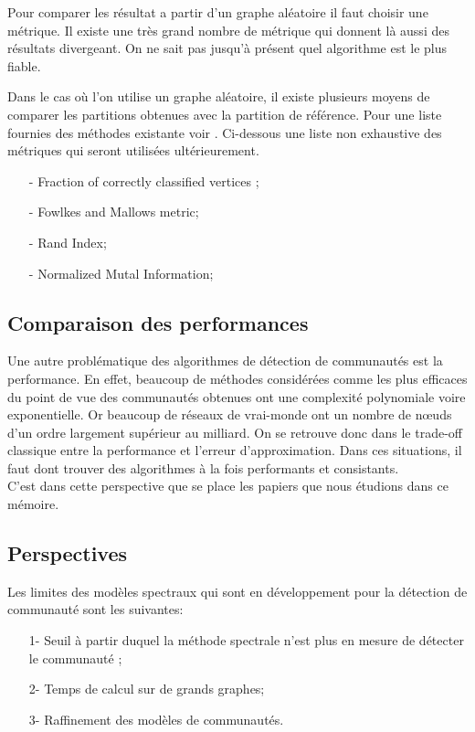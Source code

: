 Pour comparer les résultat a partir d'un graphe aléatoire il faut choisir une métrique.
Il existe une très grand nombre de métrique qui donnent là aussi des résultats divergeant.
On ne sait pas jusqu'à présent quel algorithme est le plus fiable.

Dans le cas où l'on utilise un graphe aléatoire, il existe plusieurs moyens de comparer les partitions obtenues avec la partition de référence.  
Pour une liste fournies des méthodes existante voir \cite[p.77-79]{Community_detection_in_graphs}.
Ci-dessous une liste non exhaustive des métriques qui seront utilisées ultérieurement.
\begin{itemize}
	\item[-] Fraction of correctly classified vertices ; 
	\item[-] Fowlkes and Mallows metric; 
	\item[-] Rand Index; 
	\item[-] Normalized Mutal Information; 
\end{itemize}

\subsection{Comparaison des performances}
Une autre problématique des algorithmes de détection de communautés est la performance.
En effet, beaucoup de méthodes considérées comme les plus efficaces du point de vue des communautés obtenues ont une complexité polynomiale voire exponentielle.
Or beaucoup de réseaux de vrai-monde ont un nombre de nœuds d'un ordre largement supérieur au milliard. 
On se retrouve donc dans le trade-off classique entre la performance et l'erreur d'approximation. 
Dans ces situations, il faut dont trouver des algorithmes à la fois performants et consistants.\\

C'est dans cette perspective que se place les papiers que nous étudions dans ce mémoire.
\subsection{Perspectives}
Les limites des modèles spectraux qui sont en développement pour la détection de communauté sont les suivantes:
\begin{itemize}
	\item[1-] Seuil à partir duquel la méthode spectrale n'est plus en mesure de détecter le communauté ;  
	\item[2-] Temps de calcul sur de grands graphes;  
	\item[3-] Raffinement des modèles de communautés.  
\end{itemize}